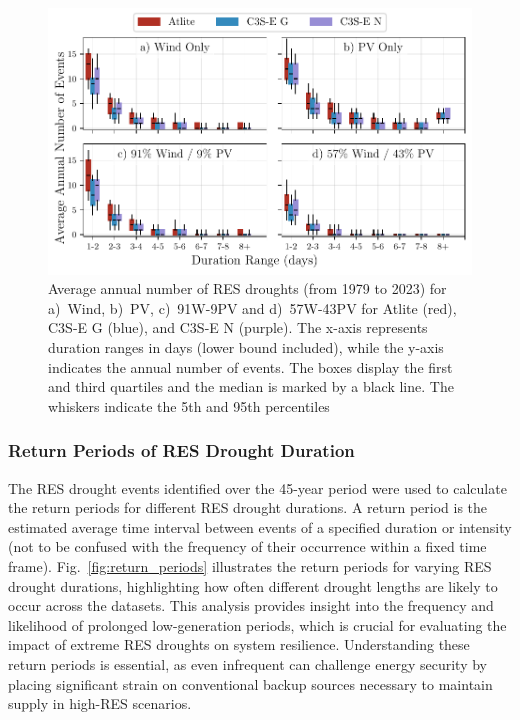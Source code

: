 \documentclass[preprint, 12pt]{elsarticle}
\begin{document}
\begin{figure}[!ht]
	\centering
	\includegraphics[width=\textwidth]{droughts_number_events.pdf}
	\caption{Average annual number of RES droughts (from 1979 to 2023) for a)~Wind, b)~PV, c)~91W-9PV and d)~57W-43PV for Atlite (red), C3S-E G (blue), and C3S-E N (purple). The x-axis represents duration ranges in days (lower bound included), while the y-axis indicates the annual number of events. The boxes display the first and third quartiles and the median is marked by a black line. The whiskers indicate the 5th and 95th percentiles}
	\label{fig:boxplot_number_events}	
\end{figure}

\subsubsection{Return Periods of RES Drought Duration}

The RES drought events identified over the 45-year period were used to calculate the return periods for different RES drought durations. A return period is the estimated average time interval between events of a specified duration or intensity (not to be confused with the frequency of their occurrence within a fixed time frame). Fig.~\ref{fig:return_periods} illustrates the return periods for varying RES drought durations, highlighting how often different drought lengths are likely to occur across the datasets. This analysis provides insight into the frequency and likelihood of prolonged low-generation periods, which is crucial for evaluating the impact of extreme RES droughts on system resilience. Understanding these return periods is essential, as even infrequent can challenge energy security by placing significant strain on conventional backup sources necessary to maintain supply in high-RES scenarios.
\end{document}
